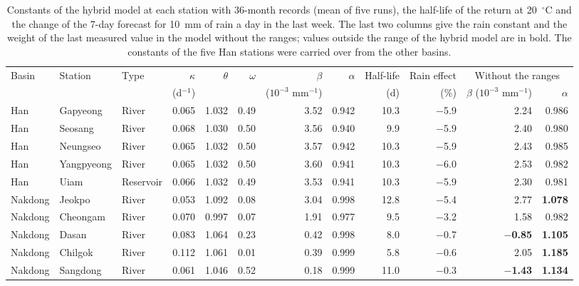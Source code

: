 \begin{table}[tbp]
\centering
\caption{Constants of the hybrid model at each station with 36-month records (mean of five runs), the half-life of the return at 20~$^\circ$C and the change of the 7-day forecast for 10~mm of rain a day in the last week. The last two columns give the rain constant and the weight of the last measured value in the model without the ranges; values outside the range of the hybrid model are in bold. The constants of the five Han stations were carried over from the other basins.}
\label{tab:S_constants}
\footnotesize
\setlength{\tabcolsep}{3.5pt}
\begin{adjustbox}{max width=\textwidth}
\begin{tabular}{lllrrrrrrrrr}
\toprule
Basin & Station & Type & $\kappa$ & $\theta$ & $\omega$ & $\beta$ & $\alpha$ & Half-life & Rain effect & \multicolumn{2}{c}{Without the ranges} \\ \cmidrule(lr){11-12}
 & & & (d$^{-1}$) & & & ($10^{-3}$ mm$^{-1}$) & & (d) & (\%) & $\beta$ ($10^{-3}$ mm$^{-1}$) & $\alpha$ \\
\midrule
Han & Gapyeong & River & 0.065 & 1.032 & 0.49 & 3.52 & 0.942 & 10.3 & $-$5.9 & 2.24 & 0.986 \\
Han & Seosang & River & 0.068 & 1.030 & 0.50 & 3.56 & 0.940 & 9.9 & $-$5.9 & 2.40 & 0.980 \\
Han & Neungseo & River & 0.065 & 1.032 & 0.50 & 3.57 & 0.942 & 10.3 & $-$5.9 & 2.43 & 0.985 \\
Han & Yangpyeong & River & 0.065 & 1.032 & 0.50 & 3.60 & 0.941 & 10.3 & $-$6.0 & 2.53 & 0.982 \\
Han & Uiam & Reservoir & 0.066 & 1.032 & 0.49 & 3.53 & 0.941 & 10.3 & $-$5.9 & 2.30 & 0.981 \\
\midrule
Nakdong & Jeokpo & River & 0.053 & 1.092 & 0.08 & 3.04 & 0.998 & 12.8 & $-$5.4 & 2.77 & \textbf{1.078} \\
Nakdong & Cheongam & River & 0.070 & 0.997 & 0.07 & 1.91 & 0.977 & 9.5 & $-$3.2 & 1.58 & 0.982 \\
Nakdong & Dasan & River & 0.083 & 1.064 & 0.23 & 0.42 & 0.998 & 8.0 & $-$0.7 & \textbf{$-$0.85} & \textbf{1.105} \\
Nakdong & Chilgok & River & 0.112 & 1.061 & 0.01 & 0.39 & 0.999 & 5.8 & $-$0.6 & 2.05 & \textbf{1.185} \\
Nakdong & Sangdong & River & 0.061 & 1.046 & 0.52 & 0.18 & 0.999 & 11.0 & $-$0.3 & \textbf{$-$1.43} & \textbf{1.134} \\

\end{tabular}
\end{adjustbox}
\end{table}
